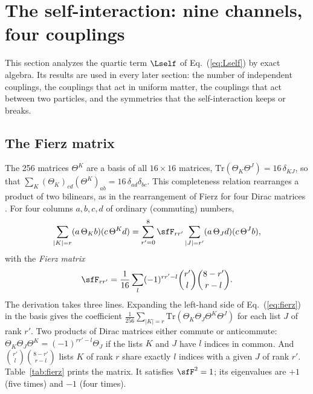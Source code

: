 \section{The self-interaction: nine channels, four couplings}
\label{sec:selfint}

This section analyzes the quartic term $\Lself$ of Eq.~(\ref{eq:Lself}) by exact algebra. Its results
are used in every later section: the number of independent couplings, the couplings that act in
uniform matter, the couplings that act between two particles, and the symmetries that the
self-interaction keeps or breaks. 

\subsection{The Fierz matrix}

The 256 matrices $\Theta^{K}$ are a basis of all $16\times16$ matrices,
$\mathrm{Tr}(\Theta_K\Theta^{J})=16\,\delta_{KJ}$, so that
$\sum_K(\Theta_K)_{cd}(\Theta^{K})_{ab}=16\,\delta_{ad}\delta_{bc}$. This completeness relation
rearranges a product of two bilinears, as in the rearrangement of Fierz for four Dirac matrices
\cite{Fierz1937}. For four columns $a,b,c,d$ of ordinary (commuting) numbers,
\begin{equation}
\sum_{|K|=r}(a\,\Theta_Kb)(c\,\Theta^{K}d)=\sum_{r'=0}^{8}\sfF_{rr'}\sum_{|J|=r'}(a\,\Theta_Jd)(c\,\Theta^{J}b),
\label{eq:fierz}
\end{equation}
with the \emph{Fierz matrix}
\begin{equation}
\sfF_{rr'}=\frac1{16}\sum_{l}(-1)^{rr'-l}\binom{r'}{l}\binom{8-r'}{r-l} .
\label{eq:fierzF}
\end{equation}
The derivation takes three lines. Expanding the left-hand side of Eq.~(\ref{eq:fierz}) in the basis
gives the coefficient $\tfrac1{256}\sum_{|K|=r}\mathrm{Tr}(\Theta_K\Theta_J\Theta^{K}\Theta^{J})$ for
each list $J$ of rank $r'$. Two products of Dirac matrices either commute or anticommute:
$\Theta_K\Theta_J\Theta^{K}=(-1)^{rr'-l}\Theta_J$ if the lists $K$ and $J$ have $l$ indices in common.
And $\binom{r'}{l}\binom{8-r'}{r-l}$ lists $K$ of rank $r$ share exactly $l$ indices with a given $J$
of rank $r'$. Table~\ref{tab:fierz} prints the matrix. It satisfies $\sfF^{2}=1$; its eigenvalues are
$+1$ (five times) and $-1$ (four times).

